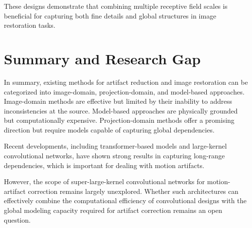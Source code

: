 These designs demonstrate that combining multiple receptive field scales is beneficial for capturing both fine details and global structures in image restoration tasks.

\section{Summary and Research Gap}
In summary, existing methods for artifact reduction and image restoration can be categorized into image-domain, projection-domain, and model-based approaches. Image-domain methods are effective but limited by their inability to address inconsistencies at the source. Model-based approaches are physically grounded but computationally expensive. Projection-domain methods offer a promising direction but require models capable of capturing global dependencies.

Recent developments, including transformer-based models and large-kernel convolutional networks, have shown strong results in capturing long-range dependencies, which is important for dealing with motion artifacts.  

However, the scope of super-large-kernel convolutional networks for motion-artifact correction remains largely unexplored. Whether such architectures can effectively combine the computational efficiency of convolutional designs with the global modeling capacity required for artifact correction remains an open question. 
 


